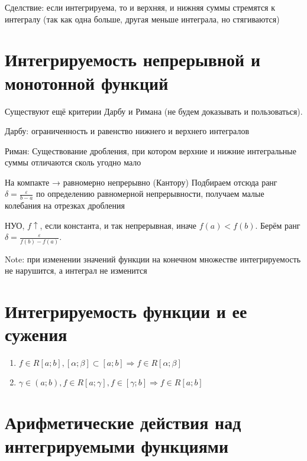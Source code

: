 \documentclass[12pt, a4paper]{article}
\begin{document}
Сделствие: если интегрируема, то и верхняя, и нижняя суммы стремятся к интегралу (так как одна больше, другая меньше интеграла, но стягиваются)


\section{Интегрируемость непрерывной и монотонной функций}

    Существуют ещё критерии Дарбу и Римана (не будем доказывать и пользоваться).

    Дарбу: ограниченность и равенство нижнего и верхнего интегралов

    Риман: Существование дробления, при котором верхние и нижние интегральные суммы отличаются сколь угодно мало

    \begin{theorem}

        На компакте → равномерно непрерывно (Кантору)
        Подбираем отсюда ранг $\delta = \frac{\varepsilon}{b - a}$ по определению равномерной непрерывности, 
        получаем малые колебания на отрезках дробления
    \end{theorem}
    
    \begin{theorem}

        НУО, $f \uparrow$, если константа, и так непрерывная, иначе $f(a) < f(b)$. 
        Берём ранг $\delta = \frac{\varepsilon}{f(b) - f(a)}$.
    \end{theorem}
    
    Note: при изменении значений функции на конечном множестве интегрируемость не нарушится, а интеграл не изменится


\section{Интегрируемость функции и ее сужения}

    \begin{enumerate}
        \item $f \in R[a; b], [\alpha; \beta] \subset [a; b] \Rightarrow f \in R[\alpha; \beta]$
        \item $\gamma \in (a; b), f \in R[a; \gamma], f \in [\gamma; b] \Rightarrow f \in R[a; b]$
    \end{enumerate}

\section{Арифметические действия над интегрируемыми функциями}
\end{document}
